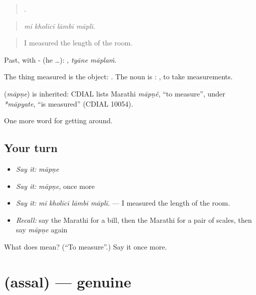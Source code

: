\begin{quote}
   .
\end{quote}

\begin{quote}
\emph{mī kholīcī lāmbī māplī.}
\end{quote}

\begin{quote}
I measured the length of the room.
\end{quote}

Past, with - (he …):  , \emph{tyāne māplaṁ}.

The thing measured is the object:  . The noun is :  , to take measurements.

\begin{cousinweb}
\textbf{} (\emph{māpṇe}) is inherited: CDIAL lists Marathi \emph{māpṇẽ}, \textquotedblleft{}to measure\textquotedblright{}, under \emph{*māpyate}, \textquotedblleft{}is measured\textquotedblright{} (CDIAL 10054).
\end{cousinweb}

\begin{grammarlens}[title={What you've built}]
One more word for getting around.
\end{grammarlens}

\subsection*{Your turn}
\begin{itemize}
\raggedright
  \item \emph{Say it:} \emph{māpṇe}
  \item \emph{Say it:} \emph{māpṇe}, once more
  \item \emph{Say it:} \emph{mī kholīcī lāmbī māplī.} — I measured the length of the room.
  \item \emph{Recall:} say the Marathi for a bill, then the Marathi for a pair of scales, then say \emph{māpṇe} again
\end{itemize}

\begin{tcolorbox}[breakable,colback=teal!4,colframe=teal!35!black,title={Before you move on}]
What does  mean? (\textquotedblleft{}To measure\textquotedblright{}.) Say it once more.
\end{tcolorbox}
\section[\texorpdfstring{\mr{अस्सल} (assal)}{अस्सल (assal)}]{ (assal) — genuine}

